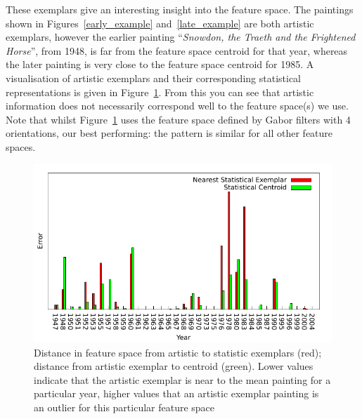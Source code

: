 These exemplars give an interesting insight into the feature space. The paintings shown in 
Figures~\ref{early_example} and~\ref{late_example} are both artistic exemplars, however the 
earlier painting ``\emph{Snowdon, the Traeth and the Frightened Horse}'', from 1948, is far from 
the feature space centroid for that year, whereas the later painting is very close to the feature 
space centroid for 1985. A visualisation of artistic exemplars and their corresponding statistical
representations is given in Figure~\ref{art_ex_stat_ex}. From this you can see that artistic 
information does not necessarily correspond well to the feature space(s) we use. Note that whilst 
Figure~\ref{art_ex_stat_ex} uses the feature space defined by Gabor filters with 4 orientations, 
our best performing: the pattern is similar for all other feature spaces.

\begin{figure}[h]
\includegraphics[width=\linewidth]{img/exemplar.pdf}
\caption[Distance in feature space from artistic to statistic exemplars]{Distance in feature space from artistic to statistic exemplars (red); distance from 
artistic exemplar to centroid (green). Lower values indicate that the artistic exemplar is near to
the mean painting for a particular year, higher values that an artistic exemplar painting is an 
outlier for this particular feature space\label{art_ex_stat_ex}}
\end{figure}
